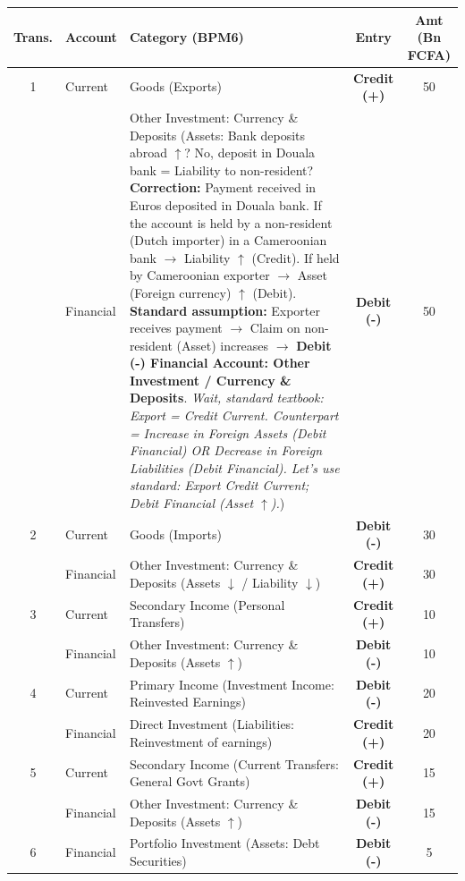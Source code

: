 \documentclass[11pt]{article}
\begin{document}
\begin{exoresolu}
\begin{center}
\begin{tabularx}{\linewidth}{|c|X|X|c|c|}\hline
\textbf{Trans.} & \textbf{Account} & \textbf{Category (BPM6)} & \textbf{Entry} & \textbf{Amt (Bn FCFA)} \\ \hline
1 & Current & Goods (Exports) & \textbf{Credit (+)} & 50 \\
  & Financial & Other Investment: Currency \& Deposits (Assets: Bank deposits abroad $\uparrow$? No, deposit in Douala bank = Liability to non-resident? \textbf{Correction:} Payment received in Euros deposited in Douala bank. If the account is held by a non-resident (Dutch importer) in a Cameroonian bank $\rightarrow$ Liability $\uparrow$ (Credit). If held by Cameroonian exporter $\rightarrow$ Asset (Foreign currency) $\uparrow$ (Debit). \textbf{Standard assumption:} Exporter receives payment $\rightarrow$ Claim on non-resident (Asset) increases $\rightarrow$ \textbf{Debit (-) Financial Account: Other Investment / Currency \& Deposits}. \textit{Wait, standard textbook: Export = Credit Current. Counterpart = Increase in Foreign Assets (Debit Financial) OR Decrease in Foreign Liabilities (Debit Financial). Let's use standard: Export Credit Current; Debit Financial (Asset $\uparrow$).}) & \textbf{Debit (-)} & 50 \\ \hline
2 & Current & Goods (Imports) & \textbf{Debit (-)} & 30 \\
  & Financial & Other Investment: Currency \& Deposits (Assets $\downarrow$ / Liability $\downarrow$) & \textbf{Credit (+)} & 30 \\ \hline
3 & Current & Secondary Income (Personal Transfers) & \textbf{Credit (+)} & 10 \\
  & Financial & Other Investment: Currency \& Deposits (Assets $\uparrow$) & \textbf{Debit (-)} & 10 \\ \hline
4 & Current & Primary Income (Investment Income: Reinvested Earnings) & \textbf{Debit (-)} & 20 \\
  & Financial & Direct Investment (Liabilities: Reinvestment of earnings) & \textbf{Credit (+)} & 20 \\ \hline
5 & Current & Secondary Income (Current Transfers: General Govt Grants) & \textbf{Credit (+)} & 15 \\
  & Financial & Other Investment: Currency \& Deposits (Assets $\uparrow$) & \textbf{Debit (-)} & 15 \\ \hline
6 & Financial & Portfolio Investment (Assets: Debt Securities) & \textbf{Debit (-)} & 5 \\

\end{tabularx}
\end{center}
\end{exoresolu}
\end{document}
